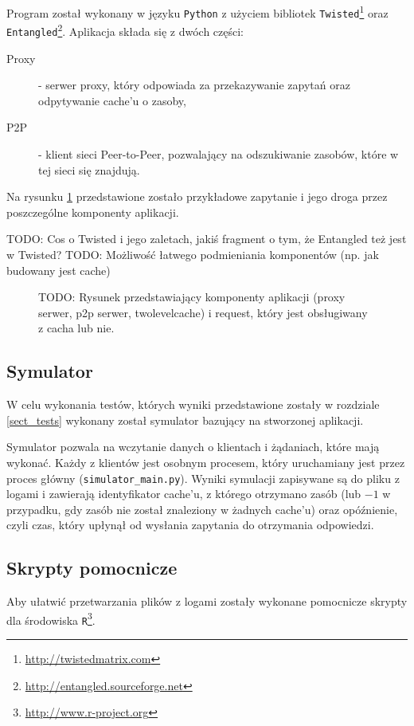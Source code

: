 \documentclass[a4paper,11pt]{scrartcl}
\newcommand{\f}{\texttt}
\newcommand{\s}{ }
\newcommand{\keszu}{cache'u}
\begin{document}
Program został wykonany w języku \f{Python} z użyciem bibliotek \f{Twisted}\footnote{\url{http://twistedmatrix.com}} oraz \f{Entangled}\footnote{\url{http://entangled.sourceforge.net}}. Aplikacja składa się z dwóch części:
\begin{description}
  \item[Proxy]{ - serwer proxy, który odpowiada za przekazywanie zapytań oraz odpytywanie \keszu\s o zasoby,}
  \item[P2P]{ - klient sieci Peer-to-Peer, pozwalający na odszukiwanie zasobów, które w tej sieci się znajdują.}
\end{description}
Na rysunku \ref{fig_architecture} przedstawione zostało przykładowe zapytanie i jego droga przez poszczególne komponenty aplikacji. 

TODO: Cos o Twisted i jego zaletach, jakiś fragment o tym, że Entangled też jest w Twisted?
TODO: Możliwość łatwego podmieniania komponentów (np. jak budowany jest cache)

\begin{figure}[h]
\caption{TODO: Rysunek przedstawiający komponenty aplikacji (proxy serwer, p2p serwer, twolevelcache) i request, który jest obsługiwany z cacha lub nie.}
\label{fig_architecture}
\end{figure}

\subsection{Symulator}
\label{sect_impl_simulator}
W celu wykonania testów, których wyniki przedstawione zostały w rozdziale \ref{sect_tests} wykonany został symulator bazujący na stworzonej aplikacji. 

Symulator pozwala na wczytanie danych o klientach i żądaniach, które mają wykonać. Każdy z klientów jest osobnym procesem, który uruchamiany jest przez proces główny (\f{simulator\_main.py}). Wyniki symulacji zapisywane są do pliku z logami i zawierają identyfikator \keszu, z którego otrzymano zasób (lub $-1$ w przypadku, gdy zasób nie został znaleziony w żadnych \keszu) oraz opóźnienie, czyli czas, który upłynął od wysłania zapytania do otrzymania odpowiedzi.

\subsection{Skrypty pomocnicze}
Aby ułatwić przetwarzania plików z logami zostały wykonane pomocnicze skrypty dla środowiska \f{R}\footnote{\url{http://www.r-project.org}}. 
\end{document}
